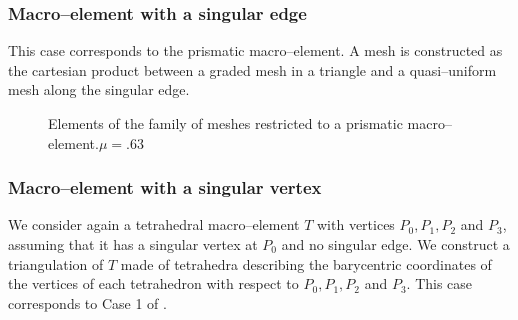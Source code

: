 \subsubsection{Macro--element with a singular edge}
This case corresponds to the prismatic macro--element.
A mesh is constructed as the cartesian product between a graded mesh
in a triangle and a quasi--uniform mesh along the singular edge.

\def\col{black}
\def\height{0}
\def\twoPi{360}
\begin{figure}[!h]\centering\label{prismatic_macroelements}
  \subfloat
  {
    \hspace{1cm}
    \hspace{1cm}
  }
  \caption{Elements of the family of
    meshes restricted to a prismatic macro--element.$\mu = .63$}
\end{figure}

\subsubsection{Macro--element with a singular vertex}

We consider again a tetrahedral macro--element $T$ with vertices $P_0, P_1, P_2$ and $P_3$, assuming that it has a singular vertex at $P_0$ and no singular edge. We construct a triangulation of $T$ made of tetrahedra describing the barycentric coordinates of the vertices of each tetrahedron with respect to $P_0, P_1, P_2$ and $P_3$. This case corresponds to Case 1 of \cite{AN}.

